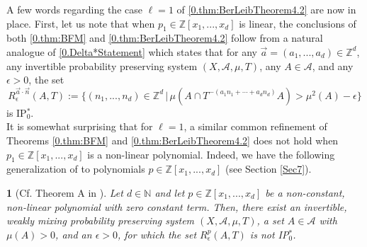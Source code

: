 \documentclass[11pt,american,preprint]{elsarticle}
\numberwithin{equation}{section}
\theoremstyle{plain}
\newtheorem{thm}{\protect\theoremname}[section]
\theoremstyle{plain*}
\theoremstyle{plain}
\theoremstyle{plain*}
\theoremstyle{plain}
\theoremstyle{plain*}
\theoremstyle{remark}
\theoremstyle{remark*}
\theoremstyle{remark}
\theoremstyle{remark*}
\theoremstyle{remark}
\theoremstyle{remark*}
\theoremstyle{plain}
\theoremstyle{definition}
\theoremstyle{plain}
\theoremstyle{plain} %
\providecommand{\theoremname}{Theorem}
\newcommand{\N}{\mathbb{N}}
\newcommand{\Z}{\mathbb{Z}}
\begin{document}
A few words regarding the case  $\ell=1$ of \cref{0.thm:BerLeibTheorem4.2} are now in place. First, let us note that when $p_1\in\Z[x_1,...,x_d]$ is linear, the conclusions of both \cref{0.thm:BFM} and \cref{0.thm:BerLeibTheorem4.2} follow from a natural analogue of \cref{0.Delta*Statement} which states that for any $\vec a=(a_1,...,a_d)\in \Z^d$, any invertible probability preserving system $(X,\mathcal A,\mu,T)$, any $A\in\mathcal A$, and any $\epsilon>0$, the set 
\begin{equation}\label{0.eq:LinearCaseT}
R^{\vec a\cdot \vec n}_\epsilon(A,T):=\{(n_1,...,n_d)\in \Z^d\,|\,\mu(A\cap T^{-(a_1n_1+\cdots+a_dn_d)}A)>\mu^2(A)-\epsilon\}
\end{equation}
is IP$_0^*$.\\
It is somewhat surprising that for $\ell=1$,
a similar common refinement of  Theorems \ref{0.thm:BFM} and \cref{0.thm:BerLeibTheorem4.2}  does not hold when $p_1\in\Z[x_1,...,x_d]$ is a non-linear polynomial. Indeed, we have the following generalization  of \cite[Theorem A]{ZelIP0Khintchine2023} to polynomials $p\in \Z[x_1,...,x_d]$ (see Section \ref{Sec7}).
\begin{thm}[Cf. Theorem A in \cite{ZelIP0Khintchine2023}]\label{0.thm:IPoFailure}
    Let $d\in\N$ and let $p\in\Z[x_1,...,x_d]$ be a non-constant, non-linear polynomial with zero constant term.  
    Then, there exist an invertible, weakly mixing probability preserving system $(X,\mathcal A,\mu,T)$, a set $A\in\mathcal A$ with $\mu(A)>0$, and an $\epsilon>0$, for which the set $R_\epsilon^{p}(A,T)$ is not {\rm IP$_0^*$}.
\end{thm}
\end{document}
